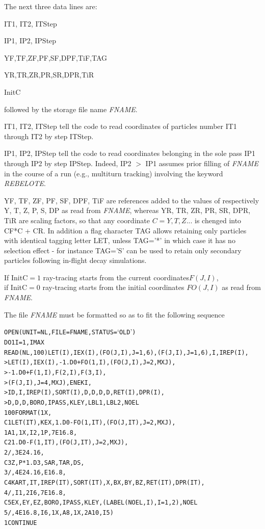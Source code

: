\noindent The next three data lines are: 

\smallskip 

IT1, IT2, ITStep

IP1, IP2, IPStep

YF,TF,ZF,PF,SF,DPF,TiF,TAG

YR,TR,ZR,PR,SR,DPR,TiR

InitC

\smallskip 

\noindent followed by the storage file name \textsl{FNAME}. 

\smallskip 

\noindent IT1, IT2, ITStep tell the code to read coordinates of particles number IT1 through  IT2 by step ITStep. 

\smallskip 

\noindent IP1, IP2, IPStep  tell the code to read coordinates belonging in the sole pass   IP1 through  IP2 by step IPStep. 
Indeed, IP2 $>$ IP1 assumes prior filling of \textsl{FNAME} in the course of a run (e.g., multiturn tracking) 
involving  the keyword \textsl{REBELOTE}. 

\smallskip 

\noindent YF, TF, ZF, PF, SF, DPF, TiF are references added to the  values of respectively Y, T, Z, P, S, DP as read 
from \textsl{FNAME}, whereas 
 YR, TR, ZR, PR, SR, DPR, TiR are scaling factors, so that any coordinate $C=Y,T,Z...$ is chenged into CF*C + CR. 
In addition a flag character TAG allows retaining only particles with identical tagging letter LET, unless 
TAG='*' in which case it has no selection effect - for instance TAG='S' can be used to retain only secondary 
particles following in-flight decay simulations. 

\smallskip 

\noindent 
If \mbox{InitC$=1$} ray-tracing starts from the current coordinates$ F(J,I)$, \\
if \mbox{InitC$=0$}  ray-tracing starts from the initial coordinates $ FO(J,I)$ as read from \textsl{FNAME}. 

\smallskip 


The  file \textsl{FNAME} must be formatted so as to fit the following \FORTRAN sequence 
\begin{alltt}
\footnotesize
         OPEN (UNIT = NL, FILE = FNAME, STATUS = `OLD')
	 DO 1 I = 1, IMAX
	    READ (NL,100) LET (I), IEX(I), (FO(J,I),J=1,6), (F(J,I),J=1,6), I, IREP(I),
     >      LET(I),IEX(I),-1.D0+FO(1,I),(FO(J,I),J=2,MXJ),
     >      -1.D0+F(1,I),F(2,I),F(3,I),
     >      (F(J,I),J=4,MXJ),ENEKI,
     >      ID,I,IREP(I), SORT(I),D,D,D,D,RET(I),DPR(I),
     >      D, D, D, BORO, IPASS, KLEY,LBL1,LBL2,NOEL
 100        FORMAT(1X,
C1   LET(IT),KEX,   1.D0-FO(1,IT),(FO(J,IT),J=2,MXJ),
     1           A1,1X,I2,1P,7E16.8,
C2   1.D0-F(1,IT),(FO(J,IT),J=2,MXJ),
     2         /,3E24.16,
C3   Z,P*1.D3,SAR,     TAR,     DS,
     3         /,4E24.16,E16.8,
C4   KART,  IT,IREP(IT),SORT(IT),X, BX,BY,BZ, RET(IT), DPR(IT),
     4         /,I1,2I6,7E16.8,
C5        EX,EY,EZ, BORO,  IPASS,  KLEY,  (LABEL(NOEL,I),I=1,2),NOEL
     5  /,4E16.8,          I6,1X,  A8,1X,  2A10,                I5)
    1    CONTINUE
\end{alltt} 

